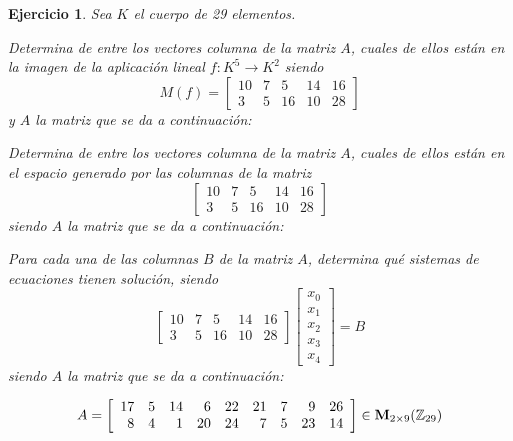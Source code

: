 \documentclass[12pt]{amsart}
\newtheorem{ejer}{Ejercicio}
\begin{document}
\begin{ejer} Sea $K$ el cuerpo de 29 elementos.
\newline
\noindent\begin{minipage}{\textwidth}
\begin{tcolorbox}[colback = green!20!white,title=Versión Núcleo]
Determina de entre los vectores columna de la matriz $A$, cuales de ellos están en la imagen de la aplicación lineal $f:K^{5} \to K^{2}$ siendo  $$ M(f) = \left[\begin{array}{rrrrr}
10 & 7 & 5 & 14 & 16 \\
3 & 5 & 16 & 10 & 28
\end{array}\right] $$ y $A$ la matriz que se da a continuación:\end{tcolorbox}
\end{minipage} \newline
\noindent\begin{minipage}{\textwidth}
\begin{tcolorbox}[colback = blue!20!white,title=Versión Anulador]
Determina de entre los vectores columna de la matriz $A$, cuales de ellos están en el espacio generado por las columnas de la matriz $$ \left[\begin{array}{rrrrr}
10 & 7 & 5 & 14 & 16 \\
3 & 5 & 16 & 10 & 28
\end{array}\right] $$ siendo $A$ la matriz que se da a continuación:\end{tcolorbox}
\end{minipage} \newline
\noindent\begin{minipage}{\textwidth} 
\begin{tcolorbox}[colback = red!20!white,title=Versión Ecuaciones Implícitas]
Para cada una de las columnas $B$ de la matriz $A$, determina qué sistemas de ecuaciones tienen solución, siendo $$ \left[\begin{array}{rrrrr}
10 & 7 & 5 & 14 & 16 \\
3 & 5 & 16 & 10 & 28
\end{array}\right] \left[\begin{array}{r}
x_{0} \\
x_{1} \\
x_{2} \\
x_{3} \\
x_{4}
\end{array}\right] = B$$ siendo $A$ la matriz que se da a continuación:
\end{tcolorbox}
\end{minipage}
\[ A = \left[\begin{array}{rrrrrrrrr}
17 & 5 & 14 & 6 & 22 & 21 & 7 & 9 & 26 \\
8 & 4 & 1 & 20 & 24 & 7 & 5 & 23 & 14
\end{array}\right] \in {\bf M}_{2\times 9}({\mathbb Z}_{29})\]
\end{ejer}
\end{document}
